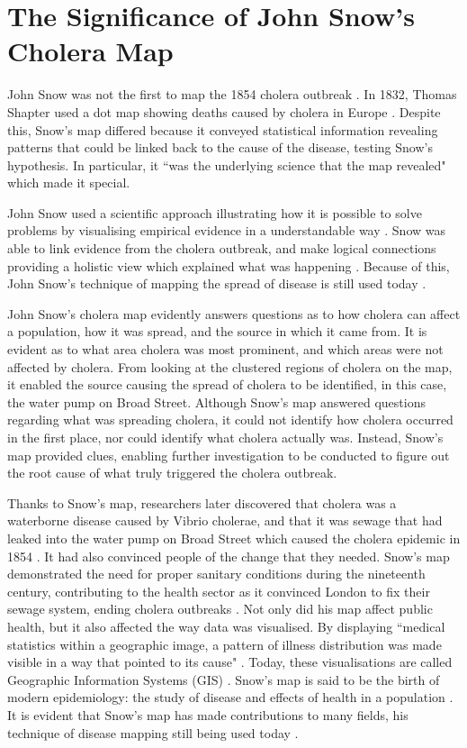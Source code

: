 \documentclass[12pt]{article}
\begin{document}
\section{The Significance of John Snow's Cholera Map}

John Snow was not the first to map the 1854 cholera outbreak \cite{history, johnson}. In 1832, Thomas Shapter used a dot map showing deaths caused by cholera in Europe \cite{howe1970some}. Despite this, Snow's map differed because it conveyed statistical information revealing patterns that could be linked back to the cause of the disease, testing Snow's hypothesis. In particular, it ``was the underlying science that the map revealed" \cite{johnson, history} which made it special.

John Snow used a scientific approach illustrating how it is possible to solve problems by visualising empirical evidence in a understandable way \cite{tedtalk}. Snow was able to link evidence from the cholera outbreak, and make logical connections providing a holistic view which explained what was happening \cite{channel1,blog}. Because of this, John Snow's technique of mapping the spread of disease is still used today \cite{channel1}. 

John Snow's cholera map evidently answers questions as to how cholera can affect a population, how it was spread, and the source in which it came from. It is evident as to what area cholera was most prominent, and which areas were not affected by cholera. From looking at the clustered regions of cholera on the map, it enabled the source causing the spread of cholera to be identified, in this case, the water pump on Broad Street. Although Snow's map answered questions regarding what was spreading cholera, it could not identify how cholera occurred in the first place, nor could identify what cholera actually was. Instead, Snow's map provided clues, enabling further investigation to be conducted to figure out the root cause of what truly triggered the cholera outbreak.  

Thanks to Snow's map, researchers later discovered that cholera was a waterborne disease caused by Vibrio cholerae, and that it was sewage that had leaked into the water pump on Broad Street which caused the cholera epidemic in 1854 \cite{channel1}. It had also convinced people of the change that they needed. Snow's map demonstrated the need for proper sanitary conditions during the nineteenth century, contributing to the health sector as it convinced London to fix their sewage system, ending cholera outbreaks \cite{top5}. Not only did his map affect public health, but it also affected the way data was visualised. By displaying ``medical statistics within a geographic image, a pattern of illness distribution was made visible in a way that pointed to its cause" \cite{test}. Today, these visualisations are called Geographic Information Systems (GIS) \cite{test}. Snow's map is said to be the birth of modern epidemiology: the study of disease and effects of health in a population \cite{youtube}. It is evident that Snow's map has made contributions to many fields, his technique of disease mapping still being used today \cite{channel1}. 
\end{document}
